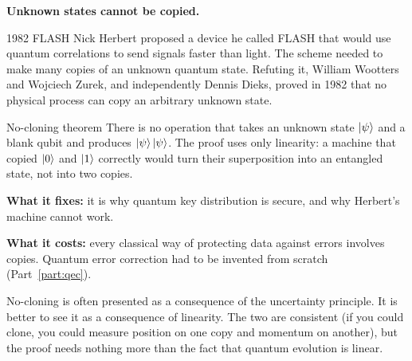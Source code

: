 \textbf{Unknown states cannot be copied.}

\begin{history}{1982 \textperiodcentered{} FLASH}
Nick Herbert proposed a device he called FLASH that would use quantum
correlations to send signals faster than light. The scheme needed to make many
copies of an unknown quantum state. Refuting it, William Wootters and Wojciech
Zurek, and independently Dennis Dieks, proved in 1982 that no physical process
can copy an arbitrary unknown state.
\end{history}

\begin{concept}{No-cloning theorem}
There is no operation that takes an unknown state $\ket{\psi}$ and a blank qubit
and produces $\ket{\psi}\ket{\psi}$. The proof uses only linearity: a machine that
copied $\ket{0}$ and $\ket{1}$ correctly would turn their superposition into an
entangled state, not into two copies.

\textbf{What it fixes:} it is why quantum key distribution is secure, and why
Herbert's machine cannot work.

\textbf{What it costs:} every classical way of protecting data against errors
involves copies. Quantum error correction had to be invented from scratch
(Part~\ref{part:qec}).
\end{concept}

No-cloning is often presented as a consequence of the uncertainty principle. It
is better to see it as a consequence of linearity. The two are consistent (if you
could clone, you could measure position on one copy and momentum on another), but
the proof needs nothing more than the fact that quantum evolution is linear.
